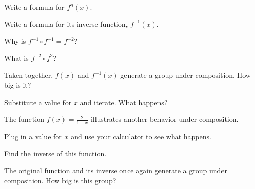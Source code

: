\documentclass[../gatm_answers.tex]{subfiles}
\begin{document}
\begin{inner_problem}
\item Write a formula for $f^n(x)$.
\end{inner_problem}

\begin{inner_problem}
\item Write a formula for its inverse function, $f^{-1}(x)$.
\end{inner_problem}

\begin{inner_problem}
\item Why is $f^{-1}\circ f^{-1}=f^{-2}$?
\end{inner_problem}

\begin{inner_problem}
\item What is $f^{-2}\circ f^2$?
\end{inner_problem}

\begin{inner_problem}
\item Taken together, $f(x)$ and $f^{-1}(x)$ generate a group under composition. How big is it?
\end{inner_problem}

\begin{inner_problem}
\item Substitute a value for $x$ and iterate. What happens?
\end{inner_problem}

\begin{outer_problem}
\item The function $f(x)=\frac{2}{1-x}$ illustrates another behavior under composition.
\end{outer_problem}

\begin{inner_problem}[start=1]
\item Plug in a value for $x$ and use your calculator to see what happens.
\end{inner_problem}

\begin{inner_problem}
\item Find the inverse of this function.
\end{inner_problem}

\begin{inner_problem}
\item The original function and its inverse once again generate a group under composition. How big is this group?
\end{inner_problem}
\end{document}
